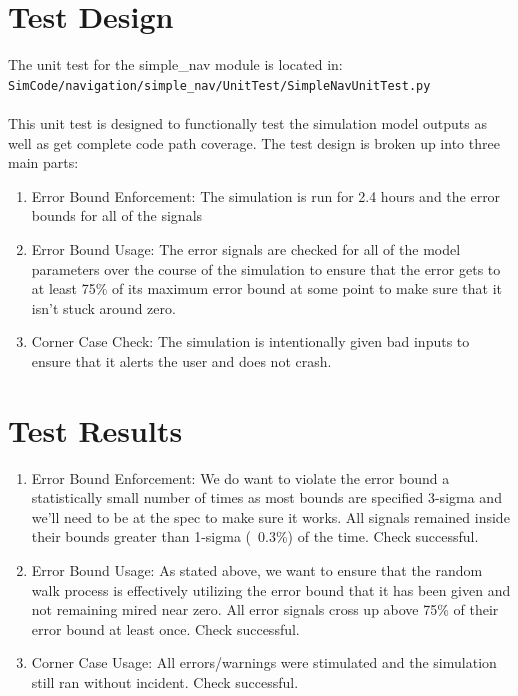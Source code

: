 \documentclass[]{LASPreport}
\begin{document}
\section{Test Design}
The unit test for the simple\_nav module is located in:\\

\noindent
{\tt SimCode/navigation/simple\_nav/UnitTest/SimpleNavUnitTest.py} \\
\\

\noindent This unit test is designed to functionally test the simulation model 
outputs as well as get complete code path coverage.  The test design is broken 
up into three main parts:\\
\begin{enumerate}
\item{Error Bound Enforcement: The simulation is run for 2.4 hours and the 
   error bounds for all of the signals }
\item{Error Bound Usage: The error signals are checked for all of the model 
   parameters over the course of the simulation to ensure that the error gets 
   to at least 75\% of its maximum error bound at some point to make sure that 
   it isn't stuck around zero.}
\item{Corner Case Check: The simulation is intentionally given bad inputs to 
   ensure that it alerts the user and does not crash.}
\end{enumerate}


\section{Test Results}
\begin{enumerate}
\item{Error Bound Enforcement: We do want to violate the error bound a 
   statistically small number of times as most bounds are specified 3-sigma 
   and we'll need to be at the spec to make sure it works.  All signals remained 
   inside their bounds greater than 1-sigma (~0.3\%) of the time.  Check 
   successful. }
\item{Error Bound Usage: As stated above, we want to ensure that the random 
   walk process is effectively utilizing the error bound that it has been 
   given and not remaining mired near zero.  All error signals cross up above 
   75\% of their error bound at least once.  Check successful.}
\item{Corner Case Usage: All errors/warnings were stimulated and the simulation 
   still ran without incident.  Check successful.}
\end{enumerate}
\end{document}
